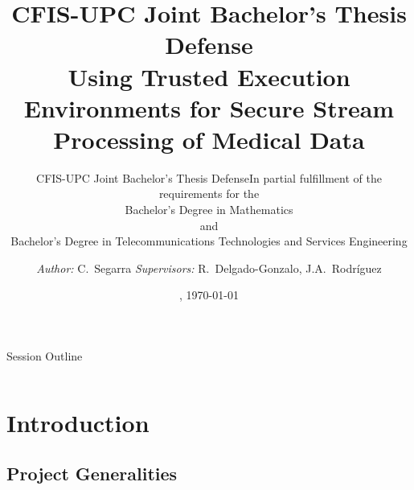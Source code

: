 \documentclass[10pt,    %
    english,            %
    xcolor=table,       %
    envcountsect,        %
    aspectratio=169     %
]{beamer}
\subtitle{CFIS-UPC Joint Bachelor's Thesis Defense} %
\title[TEEs for Secure Stream Processing] %
    {\normalsize CFIS-UPC Joint Bachelor's Thesis Defense \\ \Large Using Trusted Execution Environments for Secure Stream Processing of Medical Data}
\subtitle{\small \textmd{In partial fulfillment of the requirements for the} \\
\normalsize Bachelor's Degree in Mathematics \\ \small \textmd{and} \\ \normalsize Bachelor's Degree in Telecommunications Technologies and Services Engineering \vspace{-10pt}} %
\date[Thursday, May 30th] %
    {\datedayname, \today}
\author[] %
{\textit{Author:} C.~Segarra\inst{1, 2} \hfill \textit{Supervisors:} R.~Delgado-Gonzalo\inst{1}, J.A.~Rodr\'iguez\inst{2}}
\institute[] %
{\inst{1} Swiss Center for Electronics and Microtechnology (CSEM), Switzerland, \texttt{\{first.last\}@csem.ch} \and
\inst{2} Universitat Polit\`ecnica de Catalunya (UPC), Spain, \texttt{\{carlos.segarra@estudiant., jose.fonollosa@\}upc.edu}
}
\begin{document}
\begin{frame}
  \titlepage
\end{frame}

\begin{frame}{Session Outline}
    \begin{columns}[T,onlytextwidth]
        \hspace{1.25cm}
        \begin{column}{.4\textwidth}
            \tableofcontents[sections={1-2}]
        \end{column}
        \hspace*{-3.25cm}
        \begin{column}{.4\textwidth}
            \tableofcontents[sections={3-5}]
        \end{column}
    \end{columns}
\end{frame}

\section{Introduction}
\label{sec:introduction}
\sectionframe

\subsection{Project Generalities}
\end{document}
